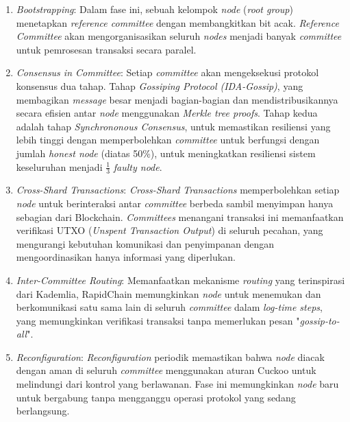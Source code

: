\begin{enumerate}
  \item \textit{Bootstrapping}: Dalam fase ini, sebuah kelompok \textit{node} (\textit{root group}) menetapkan \textit{reference committee} dengan membangkitkan bit acak. \textit{Reference Committee} akan mengorganisasikan seluruh \textit{nodes} menjadi banyak \textit{committee} untuk pemrosesan transaksi secara paralel.
  \item \textit{Consensus in Committee}: Setiap \textit{committee} akan mengeksekusi protokol konsensus dua tahap. Tahap \textit{Gossiping Protocol (IDA-Gossip)}, yang membagikan \textit{message} besar menjadi bagian-bagian dan mendistribusikannya secara efisien antar \textit{node} menggunakan \textit{Merkle tree proofs}. Tahap kedua adalah tahap \textit{Synchrononous Consensus}, untuk memastikan resiliensi yang lebih tinggi dengan memperbolehkan \textit{committee} untuk berfungsi dengan jumlah \textit{honest node} (diatas 50\%), untuk meningkatkan resiliensi sistem keseluruhan menjadi $\frac{1}{3}$ \textit{faulty node}. 
  \item \textit{Cross-Shard Transactions}: \textit{Cross-Shard Transactions} memperbolehkan setiap \textit{node} untuk berinteraksi antar \textit{committee} berbeda sambil menyimpan hanya sebagian dari Blockchain. \textit{Committees} menangani transaksi ini memanfaatkan verifikasi UTXO (\textit{Unspent Transaction Output}) di seluruh pecahan, yang mengurangi kebutuhan komunikasi dan penyimpanan dengan mengoordinasikan hanya informasi yang diperlukan.
  \item \textit{Inter-Committee Routing}: Memanfaatkan mekanisme \textit{routing} yang terinspirasi dari Kademlia, RapidChain memungkinkan \textit{node} untuk menemukan dan berkomunikasi satu sama lain di seluruh \textit{committee} dalam \textit{log-time steps}, yang memungkinkan verifikasi transaksi tanpa memerlukan pesan "\textit{gossip-to-all}". 
  \item \textit{Reconfiguration}: \textit{Reconfiguration} periodik memastikan bahwa \textit{node} diacak dengan aman di seluruh \textit{committee} menggunakan aturan Cuckoo untuk melindungi dari kontrol yang berlawanan. Fase ini memungkinkan \textit{node} baru untuk bergabung tanpa mengganggu operasi protokol yang sedang berlangsung.
\end{enumerate}
